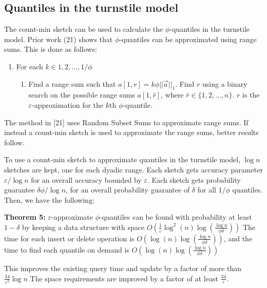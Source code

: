 \documentclass[11pt]{article}
\begin{document}
\subsection{Quantiles in the turnstile model}
The count-min sketch can be used to calculate the $\phi$-quantiles in the turnstile model.
Prior work (21) shows that $\phi$-quantiles can be approximated using range sums. This is done
as follows:
\begin{enumerate}
    \item For each $k \in {1, 2, \dots, 1/\phi}$
    \begin{enumerate}
        \item Find a range sum such that $a[1, r] = k\phi||\vec{a}||_1$. Find $r$ using a binary
        search on the possible range sums $a[1, \hat{r}]$, where $\hat{r} \in \{1, 2, \dots, n\}$.  $r$ is the
        $\varepsilon$-approximation for the $k$th $\phi$-quantile.
    \end{enumerate}
\end{enumerate}
The method in [21] uses Random Subset Sums to approximate range sums.  If instead a count-min
sketch is used to approximate the range sums, better results follow.  

To use a count-min sketch to approximate quantiles in the turnstile model, $\log n$ sketches are kept,
one for each dyadic range. Each sketch gets accuracy parameter $\varepsilon/\log n$ for an overall accuracy
bounded by $\varepsilon$. Each sketch gets probability guarantee $\delta\phi/\log n$, for
an overall probability guarantee of $\delta$ for all $1/\phi$ quantiles. Then, we have the following:

\textbf{Theorem 5:} $\varepsilon$-approximate $\phi$-quantiles can be found with probability at least
$1 - \delta$ by keeping a data structure with space $O\left(\frac{1}{\varepsilon}
\log^2(n) \log \left(\frac{\log n}{\phi \delta}\right)\right)$ The time for each insert or delete operation is
$O\left(\log(n) \log \left(\frac{\log n}{\phi \delta}\right)\right)$, and the time to find each quantile on demand 
is $O\left(\log(n)\log\left(\frac{\log n}{\phi \delta}\right)\right)$

This improves the existing query time and update by a factor of more than $\frac{34}{\varepsilon^2} \log n$
The space requirements are improved by a factor of at least $\frac{34}{\varepsilon}$. 
\end{document}
